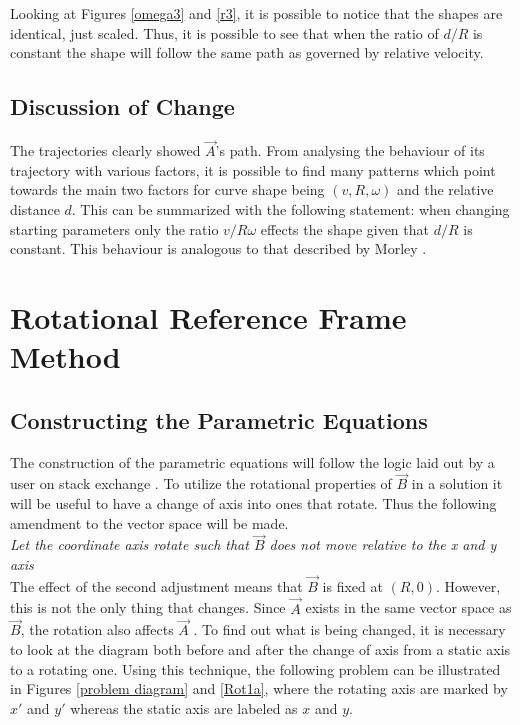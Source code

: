 \documentclass[pstricks, border=12pt]{article}
\begin{document}
Looking at Figures \ref{omega3} and \ref{r3}, it is possible to notice that the shapes are identical, just scaled. Thus, it is possible to see that when the ratio of $d/R$ is constant the shape will follow the same path as governed by relative velocity.

\subsection{Discussion of Change}
The trajectories clearly showed $\vec A$'s path. From analysing the behaviour of its trajectory with various factors, it is possible to find many patterns which point towards the main two factors for curve shape being $(v, R, \omega)$ and the relative distance $d$. This can be summarized with the following statement: when changing starting parameters only the ratio $v/R\omega$ effects the shape given that $d/R$ is constant. This behaviour is analogous to that described by Morley \cite{10.2307/2973034}.
\section{Rotational Reference Frame Method}\label{rot}
\subsection{Constructing the Parametric Equations}
The construction of the parametric equations will follow the logic laid out by a user on stack exchange \cite{mathematicsstackexchange_2017}. 
To utilize the rotational properties of $\Vec{B}$ in a solution it will be useful to have a change of axis into ones that rotate. Thus the following amendment to the vector space will be made.\\

\emph{Let the coordinate axis rotate such that $\vec B$ does not move relative to the x and y axis}\\

The effect of the second adjustment means that $\vec B$ is fixed at $(R, 0)$. However, this is not the only thing that changes. Since $\vec A$ exists in the same vector space as $\vec B$, the rotation also affects $\vec A$ \cite{ferreol_2017}. To find out what is being changed, it is necessary to look at the diagram both before and after the change of axis from a static axis to a rotating one. Using this technique, the following problem can be illustrated in Figures \ref{problem diagram} and \ref{Rot1a}, where the rotating axis are marked by $x'$ and $y'$ whereas the static axis are labeled as $x$ and $y$.
\end{document}
